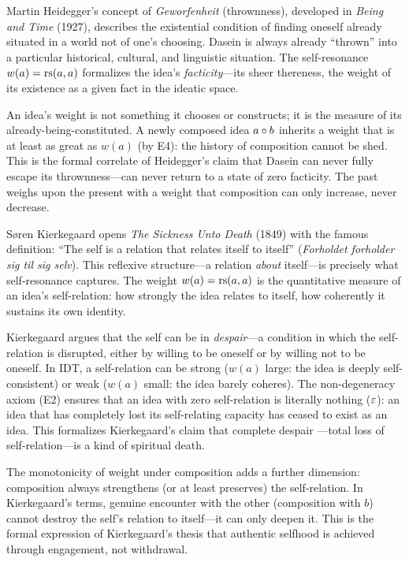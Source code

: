 \begin{interpretation}\label{interp:ch3:heidegger_thrownness}
Martin Heidegger's concept of \emph{Geworfenheit} (thrownness), developed
in \emph{Being and Time} (1927), describes the existential condition of
finding oneself already situated in a world not of one's choosing. Dasein
is always already ``thrown'' into a particular historical, cultural, and
linguistic situation. The self-resonance $w(a) = \mathrm{rs}(a, a)$ formalizes
the idea's \emph{facticity}---its sheer thereness, the weight of its
existence as a given fact in the ideatic space.

An idea's weight is not something it chooses or constructs; it is the
measure of its already-being-constituted. A newly composed idea
$a \circ b$ inherits a weight that is at least as great as $w(a)$
(by E4): the history of composition cannot be shed. This is the formal
correlate of Heidegger's claim that Dasein can never fully escape its
thrownness---can never return to a state of zero facticity. The past
weighs upon the present with a weight that composition can only increase,
never decrease.
\end{interpretation}

\begin{interpretation}\label{interp:ch3:kierkegaard_self}
S\o{}ren Kierkegaard opens \emph{The Sickness Unto Death} (1849) with the
famous definition: ``The self is a relation that relates itself to itself''
(\emph{Forholdet forholder sig til sig selv}). This reflexive
structure---a relation \emph{about} itself---is precisely what
self-resonance captures. The weight $w(a) = \mathrm{rs}(a, a)$ is the quantitative
measure of an idea's self-relation: how strongly the idea relates to
itself, how coherently it sustains its own identity.

Kierkegaard argues that the self can be in \emph{despair}---a condition
in which the self-relation is disrupted, either by willing to be oneself
or by willing not to be oneself. In IDT, a self-relation can be strong
($w(a)$ large: the idea is deeply self-consistent) or weak ($w(a)$ small:
the idea barely coheres). The non-degeneracy axiom (E2) ensures that an
idea with zero self-relation is literally nothing ($\varepsilon$): an idea
that has completely lost its self-relating capacity has ceased to exist
as an idea. This formalizes Kierkegaard's claim that complete despair
---total loss of self-relation---is a kind of spiritual death.

The monotonicity of weight under composition adds a further dimension:
composition always strengthens (or at least preserves) the self-relation.
In Kierkegaard's terms, genuine encounter with the other (composition
with $b$) cannot destroy the self's relation to itself---it can only
deepen it. This is the formal expression of Kierkegaard's thesis that
authentic selfhood is achieved through engagement, not withdrawal.
\end{interpretation}

